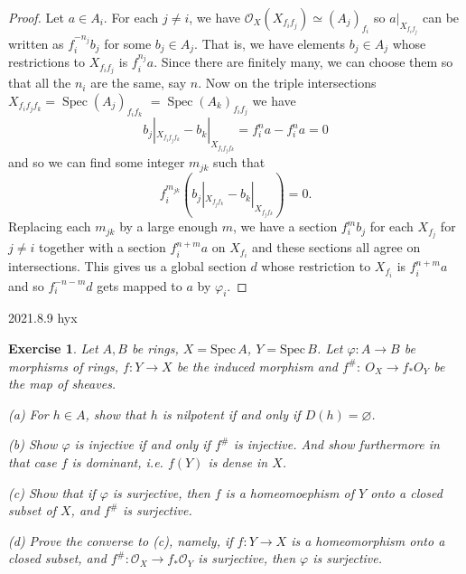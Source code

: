 \documentclass{amsart}
\newtheorem{exe}{Exercise}[subsection]
\theoremstyle{remark}\newtheorem{rmk}[theorem]{Remark}
\begin{document}
\begin{proof}
Let $a \in A_{i} .$ For each $j \neq i$, we have $\mathcal{O}_{X}\left(X_{f_{i} f_{j}}\right) \simeq\left(A_{j}\right)_{f_{i}}$ so $a|_{X_{f_{i} f_{j}}}$ can be written as $f_{i}^{-n_{j}}b_j$ for some $b_{j} \in A_{j} .$ That is, we have elements $b_{j} \in A_{j}$ whose restrictions to $X_{f_{i} f_{j}}$ is $f_{i}^{n_{j}} a$. Since there are finitely many, we can choose them so that all the $n_{i}$ are the same, say $n .$ Now on the triple intersections $X_{f_{i} f_{j} f_{k}}=\operatorname{Spec}\left(A_{j}\right)_{f_{i} f_{k}}$ $=\operatorname{Spec}\left(A_{k}\right)_{f_{i} f_{j}}$ we have $$b_{j}|_{X_{f_if_jf_k}}-b_{k}|_{X_{f_if_jf_k}}=f_{i}^{n} a-f_{i}^{n} a=0$$ and so we can find some integer $m_{j k}$ such that $$f_{i}^{m_{j k}}\left(b_{j}|_{X_{f_jf_k}}-b_{k}|_{X_{f_jf_k}}\right)=0.$$ Replacing each $m_{j k}$ by a large enough $m$, we have a section $f_{i}^{m} b_{j}$ for each $X_{f_{j}}$ for $j \neq i$ together with a section $f_{i}^{n+m} a$ on $X_{f_{i}}$ and these sections all agree on intersections. This gives us a global section $d$ whose restriction to $X_{f_{i}}$ is $f_{i}^{n+m} a$ and so $f_{i}^{-n-m}d$ gets mapped to $a$ by $\varphi_{i}$.
\end{proof}

2021.8.9 hyx 
\begin{exe}
	\label{2.2.18}
Let $A, B$ be rings, $X=\mathrm{Spec}\,A$, $Y=\mathrm{Spec}\,B$. Let $\varphi : A\rightarrow B$ be morphisms of rings, $f: Y\rightarrow X $
be the induced morphism and $f^\#:\ O_X \rightarrow f_*O_Y$ be the map of sheaves.

(a) For $h\in A$, show that $h$ is nilpotent if and only if $D(h)=\varnothing$.

(b) Show $\varphi$ is injective if and only if $f^\#$ is injective. And show furthermore in that case $f$ is \emph{dominant}, i.e. $f(Y)$ is dense in $X$.

(c) Show that if $\varphi$ is surjective, then $f$ is a homeomoephism of $Y$ onto a closed subset of $X$, and $f^\#$ is surjective.

(d) Prove the converse to (c), namely, if $f:Y\to X$ is a homeomorphism onto a closed subset, and $f^\#:\mathcal{O}_X\to f_*\mathcal{O}_Y$ is surjective, then $\varphi$ is surjective.
\end{exe}
\end{document}
